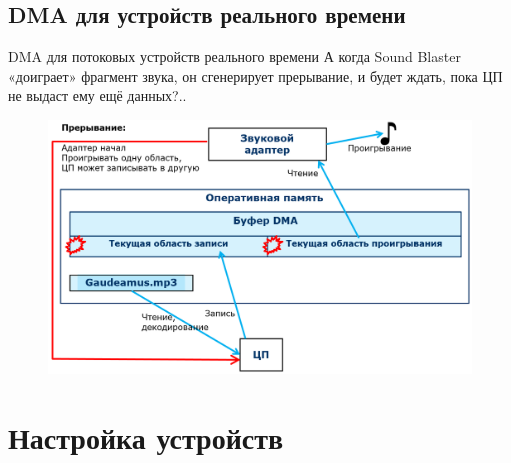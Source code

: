 \documentclass[xetex,aspectratio=43]{beamer}
\begin{document}
\subsection{DMA для устройств реального времени}

\begin{frame}{DMA для потоковых устройств реального времени}
	А когда Sound Blaster «доиграет» фрагмент звука, он сгенерирует
	прерывание, и будет ждать, пока ЦП не выдаст ему ещё данных?..

	\pause

    \begin{figure}
    	\includegraphics[height=0.65\textheight]{img/03.interrupt_DMA.png}
    \end{figure}

\end{frame}

\section{Настройка устройств}
\end{document}
